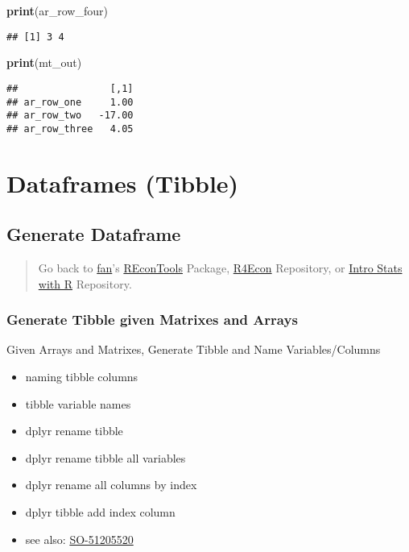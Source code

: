 \documentclass[
]{book}
\newenvironment{Shaded}{\begin{snugshade}}{\end{snugshade}}
\newcommand{\KeywordTok}[1]{\textcolor[rgb]{0.13,0.29,0.53}{\textbf{#1}}}
\newcommand{\NormalTok}[1]{#1}
\providecommand{\tightlist}{%
  \setlength{\itemsep}{0pt}\setlength{\parskip}{0pt}}
\begin{document}
\begin{Shaded}
\begin{Highlighting}[]
\KeywordTok{print}\NormalTok{(ar_row_four)}
\end{Highlighting}
\end{Shaded}

\begin{verbatim}
## [1] 3 4
\end{verbatim}

\begin{Shaded}
\begin{Highlighting}[]
\KeywordTok{print}\NormalTok{(mt_out)}
\end{Highlighting}
\end{Shaded}

\begin{verbatim}
##                [,1]
## ar_row_one     1.00
## ar_row_two   -17.00
## ar_row_three   4.05
\end{verbatim}

\hypertarget{dataframes-tibble}{%
\section{Dataframes (Tibble)}\label{dataframes-tibble}}

\hypertarget{generate-dataframe}{%
\subsection{Generate Dataframe}\label{generate-dataframe}}

\begin{quote}
Go back to \href{http://fanwangecon.github.io/CodeDynaAsset/}{fan}'s \href{https://fanwangecon.github.io/REconTools/}{REconTools} Package, \href{https://fanwangecon.github.io/R4Econ/}{R4Econ} Repository, or \href{https://fanwangecon.github.io/Stat4Econ/}{Intro Stats with R} Repository.
\end{quote}

\hypertarget{generate-tibble-given-matrixes-and-arrays}{%
\subsubsection{Generate Tibble given Matrixes and Arrays}\label{generate-tibble-given-matrixes-and-arrays}}

Given Arrays and Matrixes, Generate Tibble and Name Variables/Columns

\begin{itemize}
\tightlist
\item
  naming tibble columns
\item
  tibble variable names
\item
  dplyr rename tibble
\item
  dplyr rename tibble all variables
\item
  dplyr rename all columns by index
\item
  dplyr tibble add index column
\item
  see also: \href{https://stackoverflow.com/questions/45535157/difference-between-dplyrrename-and-dplyrrename-all}{SO-51205520}
\end{itemize}
\end{document}
